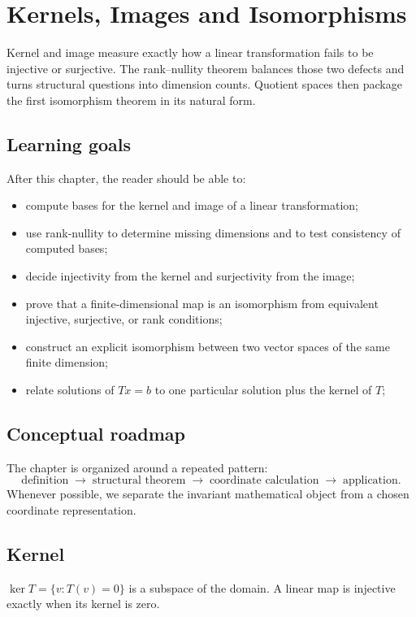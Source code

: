 \chapter{Kernels, Images and Isomorphisms}
\label{ch:i06-kernels-images-and-isomorphisms}

Kernel and image measure exactly how a linear transformation fails to be injective or surjective. The rank–nullity theorem balances those two defects and turns structural questions into dimension counts. Quotient spaces then package the first isomorphism theorem in its natural form.

\section*{Learning goals}
After this chapter, the reader should be able to:
\begin{itemize}
\item compute bases for the kernel and image of a linear transformation;
\item use rank-nullity to determine missing dimensions and to test consistency of computed bases;
\item decide injectivity from the kernel and surjectivity from the image;
\item prove that a finite-dimensional map is an isomorphism from equivalent injective, surjective, or rank conditions;
\item construct an explicit isomorphism between two vector spaces of the same finite dimension;
\item relate solutions of \(Tx=b\) to one particular solution plus the kernel of \(T\);
\end{itemize}
\section*{Conceptual roadmap}
The chapter is organized around a repeated pattern:
\[
\boxed{\text{definition}\;\longrightarrow\;\text{structural theorem}\;\longrightarrow\;\text{coordinate calculation}\;\longrightarrow\;\text{application}.}
\]
Whenever possible, we separate the invariant mathematical object from a chosen coordinate representation.

\section{Kernel}
$\ker T=\{v:T(v)=0\}$ is a subspace of the domain. A linear map is injective exactly when its kernel is zero.


